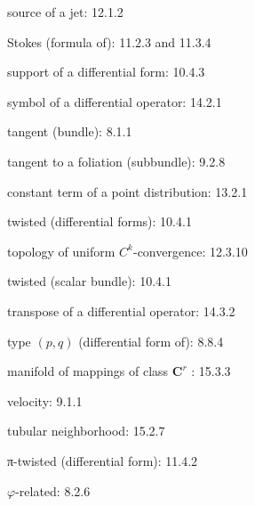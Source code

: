 source of a jet: 12.1.2

Stokes (formula of): 11.2.3 and 11.3.4

support of a differential form: 10.4.3

symbol of a differential operator: 14.2.1

tangent (bundle): 8.1.1

tangent to a foliation (subbundle): 9.2.8

constant term of a point distribution: 13.2.1

twisted (differential forms): 10.4.1

topology of uniform \(C^{k}\)-convergence: 12.3.10

twisted (scalar bundle): 10.4.1

transpose of a differential operator: 14.3.2

type \((p,q)\) (differential form of): 8.8.4

manifold of mappings of class \(\mathbf{C}^r\) : 15.3.3

velocity: 9.1.1

tubular neighborhood: 15.2.7

π-twisted (differential form): 11.4.2

\(\varphi\)-related: 8.2.6



